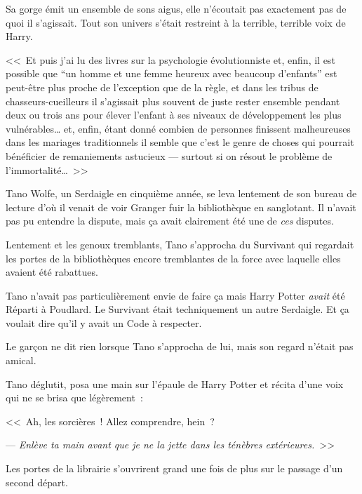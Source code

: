 Sa gorge émit un ensemble de sons aigus, elle n'écoutait pas exactement pas de quoi il s'agissait. Tout son univers s'était restreint à la terrible, terrible voix de Harry.

<<~Et puis j'ai lu des livres sur la psychologie évolutionniste et, enfin, il est possible que “un homme et une femme heureux avec beaucoup d'enfants” est peut-être plus proche de l'exception que de la règle, et dans les tribus de chasseurs-cueilleurs il s'agissait plus souvent de juste rester ensemble pendant deux ou trois ans pour élever l'enfant à ses niveaux de développement les plus vulnérables… et, enfin, étant donné combien de personnes finissent malheureuses dans les mariages traditionnels il semble que c'est le genre de choses qui pourrait bénéficier de remaniements astucieux — surtout si on résout le problème de l'immortalité…~>>

\later

Tano Wolfe, un Serdaigle en cinquième année, se leva lentement de son bureau de lecture d'où il venait de voir Granger fuir la bibliothèque en sanglotant. Il n'avait pas pu entendre la dispute, mais ça avait clairement été une de \emph{ces} disputes.

Lentement et les genoux tremblants, Tano s'approcha du Survivant qui regardait les portes de la bibliothèques encore tremblantes de la force avec laquelle elles avaient été rabattues.

Tano n'avait pas particulièrement envie de faire ça mais Harry Potter \emph{avait} été Réparti à Poudlard. Le Survivant était techniquement un autre Serdaigle. Et ça voulait dire qu'il y avait un Code à respecter.

Le garçon ne dit rien lorsque Tano s'approcha de lui, mais son regard n'était pas amical.

Tano déglutit, posa une main sur l'épaule de Harry Potter et récita d'une voix qui ne se brisa que légèrement~:

<<~Ah, les sorcières~! Allez comprendre, hein~?

--- \emph{Enlève ta main avant que je ne la jette dans les ténèbres extérieures.}~>>

Les portes de la librairie s'ouvrirent grand une fois de plus sur le passage d'un second départ.
